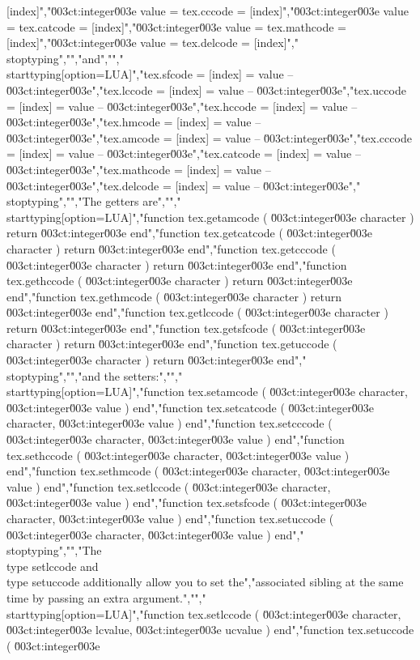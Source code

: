 [index]","\u003ct:integer\u003e value = tex.cccode   = [index]","\u003ct:integer\u003e value = tex.catcode  = [index]","\u003ct:integer\u003e value = tex.mathcode = [index]","\u003ct:integer\u003e value = tex.delcode  = [index]","\\stoptyping","","and","","\\starttyping[option=LUA]","tex.sfcode   = [index] = value -- \u003ct:integer\u003e","tex.lccode   = [index] = value -- \u003ct:integer\u003e","tex.uccode   = [index] = value -- \u003ct:integer\u003e","tex.hccode   = [index] = value -- \u003ct:integer\u003e","tex.hmcode   = [index] = value -- \u003ct:integer\u003e","tex.amcode   = [index] = value -- \u003ct:integer\u003e","tex.cccode   = [index] = value -- \u003ct:integer\u003e","tex.catcode  = [index] = value -- \u003ct:integer\u003e","tex.mathcode = [index] = value -- \u003ct:integer\u003e","tex.delcode  = [index] = value -- \u003ct:integer\u003e","\\stoptyping","","The getters are","","\\starttyping[option=LUA]","function tex.getamcode  ( \u003ct:integer\u003e character ) return \u003ct:integer\u003e end","function tex.getcatcode ( \u003ct:integer\u003e character ) return \u003ct:integer\u003e end","function tex.getcccode  ( \u003ct:integer\u003e character ) return \u003ct:integer\u003e end","function tex.gethccode  ( \u003ct:integer\u003e character ) return \u003ct:integer\u003e end","function tex.gethmcode  ( \u003ct:integer\u003e character ) return \u003ct:integer\u003e end","function tex.getlccode  ( \u003ct:integer\u003e character ) return \u003ct:integer\u003e end","function tex.getsfcode  ( \u003ct:integer\u003e character ) return \u003ct:integer\u003e end","function tex.getuccode  ( \u003ct:integer\u003e character ) return \u003ct:integer\u003e end","\\stoptyping","","and the setters:","","\\starttyping[option=LUA]","function tex.setamcode  ( \u003ct:integer\u003e character, \u003ct:integer\u003e value ) end","function tex.setcatcode ( \u003ct:integer\u003e character, \u003ct:integer\u003e value ) end","function tex.setcccode  ( \u003ct:integer\u003e character, \u003ct:integer\u003e value ) end","function tex.sethccode  ( \u003ct:integer\u003e character, \u003ct:integer\u003e value ) end","function tex.sethmcode  ( \u003ct:integer\u003e character, \u003ct:integer\u003e value ) end","function tex.setlccode  ( \u003ct:integer\u003e character, \u003ct:integer\u003e value ) end","function tex.setsfcode  ( \u003ct:integer\u003e character, \u003ct:integer\u003e value ) end","function tex.setuccode  ( \u003ct:integer\u003e character, \u003ct:integer\u003e value ) end","\\stoptyping","","The \\type {setlccode} and \\type {setuccode} additionally allow you to set the","associated sibling at the same time by passing an extra argument.","","\\starttyping[option=LUA]","function tex.setlccode  ( \u003ct:integer\u003e character, \u003ct:integer\u003e lcvalue, \u003ct:integer\u003e ucvalue ) end","function tex.setuccode  ( \u003ct:integer\u003e 